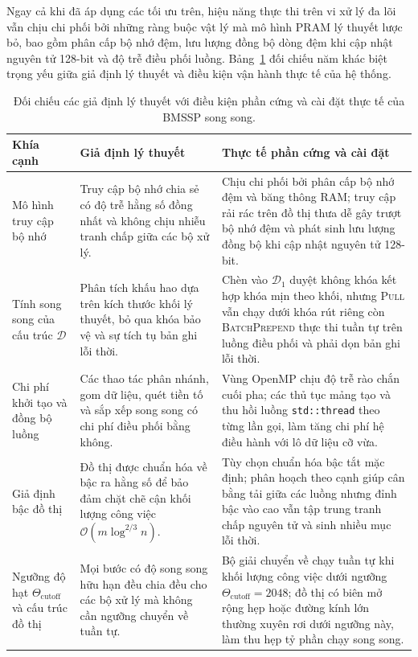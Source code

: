 Ngay cả khi đã áp dụng các tối ưu trên, hiệu năng thực thi trên vi xử lý đa lõi vẫn chịu chi phối bởi những ràng buộc vật lý mà mô hình PRAM lý thuyết lược bỏ, bao gồm phân cấp bộ nhớ đệm, lưu lượng đồng bộ dòng đệm khi cập nhật nguyên tử 128-bit và độ trễ điều phối luồng. Bảng~\ref{tab:theory_vs_hardware} đối chiếu năm khác biệt trọng yếu giữa giả định lý thuyết và điều kiện vận hành thực tế của hệ thống.

\begin{table}[H]
\centering
{\small\setlength{\baselineskip}{14pt}
\begin{tabularx}{\textwidth}{>{\raggedright\arraybackslash}p{3.5cm} >{\raggedright\arraybackslash}X >{\raggedright\arraybackslash}X}
\toprule
\textbf{Khía cạnh} & \textbf{Giả định lý thuyết} & \textbf{Thực tế phần cứng và cài đặt} \\
\midrule
Mô hình truy cập bộ nhớ &
Truy cập bộ nhớ chia sẻ có độ trễ hằng số đồng nhất và không chịu nhiễu tranh chấp giữa các bộ xử lý. &
Chịu chi phối bởi phân cấp bộ nhớ đệm và băng thông RAM; truy cập rải rác trên đồ thị thưa dễ gây trượt bộ nhớ đệm và phát sinh lưu lượng đồng bộ khi cập nhật nguyên tử 128-bit. \\
\addlinespace[5pt]
Tính song song của cấu trúc $\mathcal{D}$ &
Phân tích khấu hao dựa trên kích thước khối lý thuyết, bỏ qua khóa bảo vệ và sự tích tụ bản ghi lỗi thời. &
Chèn vào $\mathcal{D}_1$ duyệt không khóa kết hợp khóa mịn theo khối, nhưng \textsc{Pull} vẫn chạy dưới khóa rút riêng còn \textsc{BatchPrepend} thực thi tuần tự trên luồng điều phối và phải dọn bản ghi lỗi thời. \\
\addlinespace[5pt]
Chi phí khởi tạo và đồng bộ luồng &
Các thao tác phân nhánh, gom dữ liệu, quét tiền tố và sắp xếp song song có chi phí điều phối bằng không. &
Vùng OpenMP chịu độ trễ rào chắn cuối pha; các thủ tục mảng tạo và thu hồi luồng \texttt{std::thread} theo từng lần gọi, làm tăng chi phí hệ điều hành với lô dữ liệu cỡ vừa. \\
\addlinespace[5pt]
Giả định bậc đồ thị &
Đồ thị được chuẩn hóa về bậc ra hằng số để bảo đảm chặt chẽ cận khối lượng công việc $\mathcal{O}(m \log^{2/3} n)$. &
Tùy chọn chuẩn hóa bậc tắt mặc định; phân hoạch theo cạnh giúp cân bằng tải giữa các luồng nhưng đỉnh bậc vào cao vẫn tập trung tranh chấp nguyên tử và sinh nhiều mục lỗi thời. \\
\addlinespace[5pt]
Ngưỡng độ hạt $\Theta_{\mathrm{cutoff}}$ và cấu trúc đồ thị &
Mọi bước có độ song song hữu hạn đều chia đều cho các bộ xử lý mà không cần ngưỡng chuyển về tuần tự. &
Bộ giải chuyển về chạy tuần tự khi khối lượng công việc dưới ngưỡng $\Theta_{\mathrm{cutoff}} = 2048$; đồ thị có biên mở rộng hẹp hoặc đường kính lớn thường xuyên rơi dưới ngưỡng này, làm thu hẹp tỷ phần chạy song song. \\
\bottomrule
\end{tabularx}
}
\caption{Đối chiếu các giả định lý thuyết với điều kiện phần cứng và cài đặt thực tế của BMSSP song song.}
\label{tab:theory_vs_hardware}
\end{table}

